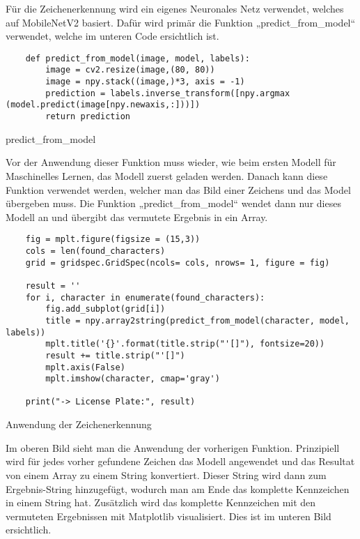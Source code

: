 Für die Zeichenerkennung wird ein eigenes Neuronales Netz verwendet, welches auf MobileNetV2 basiert. Dafür wird primär die Funktion „predict{\_}from{\_}model“ 
verwendet, welche im unteren Code ersichtlich ist.

\begin{listing}[H]
    \begin{verbatim}
    def predict_from_model(image, model, labels):
        image = cv2.resize(image,(80, 80))
        image = npy.stack((image,)*3, axis = -1)
        prediction = labels.inverse_transform([npy.argmax (model.predict(image[npy.newaxis,:]))])
        return prediction
    \end{verbatim}
    \caption{predict{\_}from{\_}model}
\end{listing}

Vor der Anwendung dieser Funktion muss wieder, wie beim ersten Modell für Maschinelles Lernen, das Modell zuerst geladen werden. Danach kann diese Funktion verwendet werden, 
welcher man das Bild einer Zeichens und das Model übergeben muss. Die Funktion „predict{\_}from{\_}model“ wendet dann nur dieses Modell an und übergibt das 
vermutete Ergebnis in ein Array.

\begin{longlisting}
    \begin{verbatim}
    fig = mplt.figure(figsize = (15,3))
    cols = len(found_characters)
    grid = gridspec.GridSpec(ncols= cols, nrows= 1, figure = fig)

    result = ''
    for i, character in enumerate(found_characters):
        fig.add_subplot(grid[i])
        title = npy.array2string(predict_from_model(character, model, labels))
        mplt.title('{}'.format(title.strip("'[]"), fontsize=20))
        result += title.strip("'[]")
        mplt.axis(False)
        mplt.imshow(character, cmap='gray')

    print("-> License Plate:", result)
    \end{verbatim}
    \caption{Anwendung der Zeichenerkennung}
\end{longlisting}

Im oberen Bild sieht man die Anwendung der vorherigen Funktion. Prinzipiell wird für jedes vorher gefundene Zeichen das Modell angewendet 
und das Resultat von einem Array zu einem String konvertiert. Dieser String wird dann zum Ergebnis-String hinzugefügt, wodurch man am Ende das 
komplette Kennzeichen in einem String hat. Zusätzlich wird das komplette Kennzeichen mit den vermuteten Ergebnissen mit Matplotlib visualisiert. 
Dies ist im unteren Bild ersichtlich.

